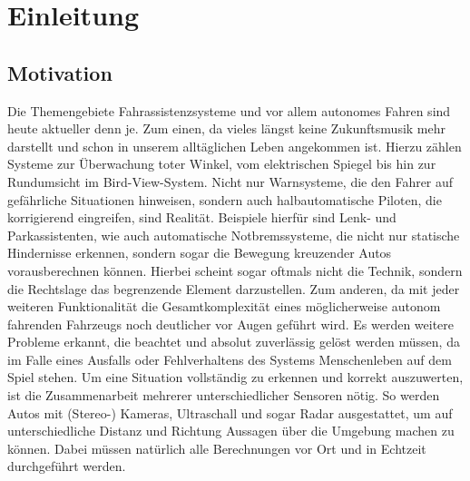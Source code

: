 \section{Einleitung}
\label{sec:einleitung}
\subsection{Motivation}
Die Themengebiete Fahrassistenzsysteme und vor allem autonomes Fahren sind heute aktueller denn je. Zum einen, da vieles längst keine Zukunftsmusik mehr darstellt und schon in unserem alltäglichen Leben angekommen ist. Hierzu zählen Systeme zur Überwachung toter Winkel, vom elektrischen Spiegel bis hin zur Rundumsicht im Bird-View-System. Nicht nur Warnsysteme, die den Fahrer auf gefährliche Situationen hinweisen, sondern auch halbautomatische Piloten, die korrigierend eingreifen, sind Realität. Beispiele hierfür sind Lenk- und Parkassistenten, wie auch automatische Notbremssysteme, die nicht nur statische Hindernisse erkennen, sondern sogar die Bewegung kreuzender Autos vorausberechnen können. Hierbei scheint sogar oftmals nicht die Technik, sondern die Rechtslage das begrenzende Element darzustellen.
\newline
Zum anderen, da mit jeder weiteren Funktionalität die Gesamtkomplexität eines möglicherweise autonom fahrenden Fahrzeugs noch deutlicher vor Augen geführt wird. Es werden weitere Probleme erkannt, die beachtet und absolut zuverlässig gelöst werden müssen, da im Falle eines Ausfalls oder Fehlverhaltens des Systems Menschenleben auf dem Spiel stehen. Um eine Situation vollständig zu erkennen und korrekt auszuwerten, ist die Zusammenarbeit mehrerer unterschiedlicher Sensoren nötig. So werden Autos mit (Stereo-) Kameras, Ultraschall und sogar Radar ausgestattet, um auf unterschiedliche Distanz und Richtung Aussagen über die Umgebung machen zu können. Dabei müssen natürlich alle Berechnungen vor Ort und in Echtzeit durchgeführt werden.

